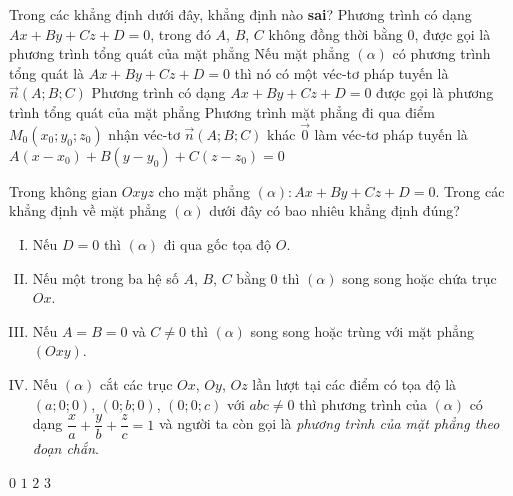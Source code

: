 \begin{ex}%
	Trong các khẳng định dưới đây, khẳng định nào \textbf{sai}?
	\choice
	{Phương trình có dạng $Ax+By+Cz+D=0$, trong đó $A$, $B$, $C$ không đồng thời bằng $0$, được gọi là phương trình tổng quát của mặt phẳng}
	{Nếu mặt phẳng $(\alpha)$ có phương trình tổng quát là $Ax+By+Cz+D=0$ thì nó có một véc-tơ pháp tuyến là $\vec{n}(A;B;C)$}
	{\True Phương trình có dạng $Ax+By+Cz+D=0$ được gọi là phương trình tổng quát của mặt phẳng}
	{Phương trình mặt phẳng đi qua điểm $M_0(x_0;y_0;z_0)$ nhận véc-tơ $\vec{n}(A;B;C)$ khác $\vec{0}$ làm véc-tơ pháp tuyến là $A(x-x_0)+B(y-y_0)+C(z-z_0)=0$}
\end{ex}
\begin{ex}%
	Trong không gian $Oxyz$ cho mặt phẳng $(\alpha):Ax+By+Cz+D=0$. Trong các khẳng định về mặt phẳng $(\alpha)$ dưới đây có bao nhiêu khẳng định đúng?
	\begin{enumerate}[(I)]
		\item Nếu $D=0$ thì $(\alpha)$ đi qua gốc tọa độ $O$.
		\item Nếu một trong ba hệ số $A$, $B$, $C$ bằng $0$ thì $(\alpha)$ song song hoặc chứa trục $Ox$.
		\item Nếu $A=B=0$ và $C\neq 0$ thì $(\alpha)$ song song hoặc trùng với mặt phẳng $(Oxy)$.
		\item Nếu $(\alpha)$ cắt các trục $Ox$, $Oy$, $Oz$ lần lượt tại các điểm có tọa độ là $(a;0;0)$, $(0;b;0)$, $(0;0;c)$ với $abc\neq 0$ thì phương trình của $(\alpha)$ có dạng $\dfrac{x}{a}+\dfrac{y}{b}+\dfrac{z}{c}=1$ và người ta còn gọi là \textit{phương trình của mặt phẳng theo đoạn chắn}.
	\end{enumerate}
	\choice
	{$0$}
	{$1$}
	{$2$}
	{\True $3$}
\end{ex}


